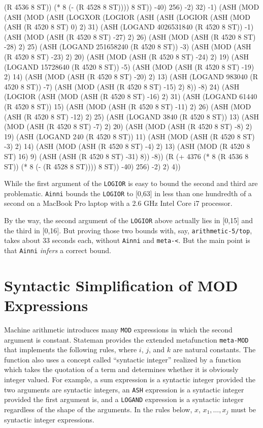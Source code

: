 \documentclass[submission,copyright,creativecommons]{eptcs}
\newcommand{\ptt}[1]{\tt{#1}}
\begin{document}
\begin{acl2p}
{{    (R 4536 8 ST)) (* 8 (- (R 4528 8 ST)))) 8 ST)) -40) 256) -2) 32) -1)
  (ASH (MOD (ASH (MOD (ASH (LOGXOR (LOGIOR (ASH (ASH (LOGIOR (ASH (MOD (ASH (R 4520 8 ST) 0) 2) 31) (ASH (LOGAND 4026531840 (R 4520
    8 ST)) -1) (ASH (MOD (ASH (R 4520 8 ST) -27) 2) 26) (ASH (MOD (ASH (R 4520 8 ST) -28) 2) 25) (ASH (LOGAND 251658240 (R 4520 8 ST))
    -3) (ASH (MOD (ASH (R 4520 8 ST) -23) 2) 20) (ASH (MOD (ASH (R 4520 8 ST) -24) 2) 19) (ASH (LOGAND 15728640 (R 4520 8 ST)) -5) (ASH
    (MOD (ASH (R 4520 8 ST) -19) 2) 14) (ASH (MOD (ASH (R 4520 8 ST) -20) 2) 13) (ASH (LOGAND 983040 (R 4520 8 ST)) -7) (ASH (MOD (ASH
    (R 4520 8 ST) -15) 2) 8)) -8) 24) (ASH (LOGIOR (ASH (MOD (ASH (R 4520 8 ST) -16) 2) 31) (ASH (LOGAND 61440 (R 4520 8 ST)) 15) (ASH
    (MOD (ASH (R 4520 8 ST) -11) 2) 26) (ASH (MOD (ASH (R 4520 8 ST) -12) 2) 25) (ASH (LOGAND 3840 (R 4520 8 ST)) 13) (ASH (MOD (ASH (R
    4520 8 ST) -7) 2) 20) (ASH (MOD (ASH (R 4520 8 ST) -8) 2) 19) (ASH (LOGAND 240 (R 4520 8 ST)) 11) (ASH (MOD (ASH (R 4520 8 ST) -3)
    2) 14) (ASH (MOD (ASH (R 4520 8 ST) -4) 2) 13) (ASH (MOD (R 4520 8 ST) 16) 9) (ASH (ASH (R 4520 8 ST) -31) 8)) -8)) (R (+ 4376 (* 8
    (R 4536 8 ST)) (* 8 (- (R 4528 8 ST)))) 8 ST)) -40) 256) -2) 2) 4))
}}\end{acl2p}


While the first argument of the {\ptt{LOGIOR}} is easy to bound the second and third are problematic. 
{\ptt{Ainni}} bounds the {\ptt{LOGIOR}} to [0,63] in less than one hundredth
of a second on a MacBook Pro laptop with a 2.6 GHz Intel Core i7 processor.

By the way, the second argument of the {\ptt{LOGIOR}} above actually lies in
[0,15] and the third in [0,16].  But proving those two bounds with, say,
{\ptt{arithmetic-5/top}}, takes about 33 seconds each, without {\ptt{Ainni}}
and {\ptt{meta-<}}.  But the main point is that {\ptt{Ainni}}
{\em{infers}} a correct bound.

\section{Syntactic Simplification of MOD Expressions}
\label{metamod}

Machine arithmetic introduces many {\ptt{MOD}} expressions in which the
second argument is constant.  Stateman provides the extended metafunction
{\ptt{meta-MOD}} that implements the following rules, where $i$, $j$, and $k$ are
natural constants.  The function also uses a concept called ``syntactic
integer'' realized by a function which takes the quotation of a term and
determines whether it is obviously integer valued.  For example, a sum
expression is a syntactic integer provided the two arguments are syntactic
integers, an {\ptt{ASH}} expression is a syntactic integer provided the first
argument is, and a {\ptt{LOGAND}} expression is a syntactic integer
regardless of the shape of the arguments.  In the rules below, $x$, $x_1, \ldots, x_j$
must be syntactic integer expressions.
\end{document}
